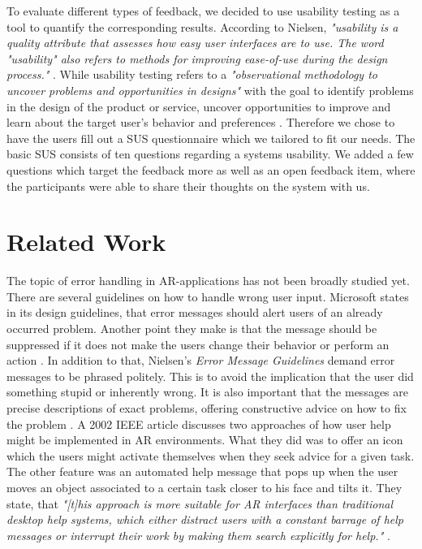 \documentclass[11pt, a4paper]{article}
\begin{document}
		To evaluate different types of feedback, we decided to use usability testing as a tool to quantify the corresponding results. According to Nielsen, \textit{"usability is a quality attribute that assesses how easy user interfaces are to use. The word "usability" also refers to methods for improving ease-of-use during the design process."} \cite{Nielsen2012}. While usability testing refers to a \textit{"observational methodology to uncover problems and opportunities in designs"} with the goal to identify problems in the design of the product or service, uncover opportunities to improve and learn about the target user's behavior and preferences \cite{Moran2019}. Therefore we chose to have the users fill out a \ac{SUS} questionnaire which we tailored to fit our needs. The basic \ac{SUS} consists of ten questions regarding a systems usability. We added a few questions which target the feedback more as well as an open feedback item, where the participants were able to share their thoughts on the system with us. 

	\section*{Related Work}\label{sec:relatedwork}
		The topic of error handling in \ac{AR}-applications has not been broadly studied yet. There are several guidelines on how to handle wrong user input. Microsoft states in its design guidelines, that error messages should alert users of an already occurred problem. Another point they make is that the message should be suppressed if it does not make the users change their behavior or perform an action \cite{Microsoft2018}. In addition to that, Nielsen's \textit{Error Message Guidelines} demand error messages to be phrased politely. This is to avoid the implication that the user did something stupid or inherently wrong. It is also important that the messages are precise descriptions of exact problems, offering constructive advice on how to fix the problem \cite{Nielsen2001}. A 2002 IEEE article discusses two approaches of how user help might be implemented in \ac{AR} environments. What they did was to offer an icon which the users might activate themselves when they seek advice for a given task. The other feature was an automated help message that pops up when the user moves an object associated to a certain task closer to his face and tilts it. They state, that \textit{"\textnormal{[t]}his approach is more suitable for AR interfaces than traditional desktop help systems, which either distract users with a constant barrage of help messages or interrupt their work by making them search explicitly for help."} \cite{Poupyrev2002}.
\end{document}
